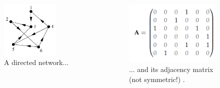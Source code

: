 \documentclass[serif, aspectratio=169]{beamer}
\begin{document}
\begin{frame}

\begin{columns}
\begin{column}{0.5\textwidth}
\begin{figure}
    \centering
    \includegraphics[width = 0.7\textwidth]{figure/directed_network}
\caption{A directed network...}
\end{figure}
\end{column}
\begin{column}{0.5\textwidth}
\begin{figure}
    \centering
    \includegraphics{figure/directed_adj_matrix}
\caption{... and its adjacency matrix (not symmetric!) \autocite[112]{newman_networks_2010}.}
\end{figure}
\end{column}
\end{columns}
\end{frame}
\end{document}
